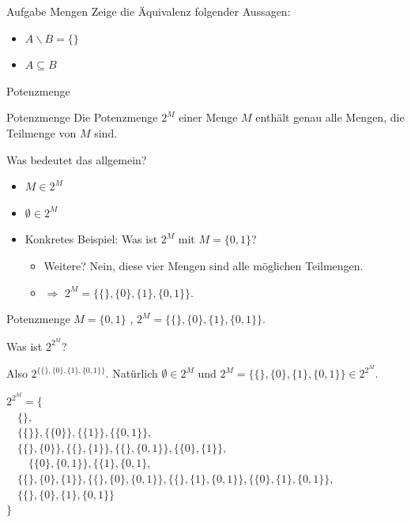 \documentclass{beamer}
\begin{document}
\begin{frame}{Aufgabe Mengen}
	Zeige die Äquivalenz folgender Aussagen:
	\begin{itemize}
		\item $A \backslash B = \{\}$
		\item $A \subseteq B$
	\end{itemize}
\end{frame}

\begin{frame}{Potenzmenge}
	 
	
	\begin{block}{Potenzmenge}
		Die Potenzmenge   $2^M$   einer Menge $M$   enthält genau alle Mengen, die Teilmenge von $M$ sind.	
	\end{block}
	
	 
	
	Was bedeutet das allgemein?
	
	\begin{itemize}
		\item $M \in 2^M$
		\item $\emptyset \in 2^M$
		\item Konkretes Beispiel:   Was ist $2^M$ mit $M = \{0, 1\}$?
		\begin{itemize}
			\pitem Natürlich $\emptyset \in 2^M$ und $\{0, 1\} \in 2^M$.
			\pitem $\{0\} \in 2^M$   und $\{1\} \in 2^M$.
			\item Weitere? \pause  Nein, diese vier Mengen sind alle möglichen Teilmengen.
			\item $\Rightarrow$ $2^M = \{\{\}, \{0\}, \{1\}, \{0, 1\}\}$.
		\end{itemize}
	\end{itemize}
\end{frame}

\begin{frame}{Potenzmenge}
	$M = \{0, 1\}$  , $2^M = \{\{\}, \{0\}, \{1\}, \{0, 1\}\}$. 
	
	Was ist $2^{2^M}$?
	
	\begin{itemize}
		\pitem Also $2^{\{\{\}, \{0\}, \{1\}, \{0, 1\}\}}$.
		\pitem Natürlich $\emptyset \in 2^M$ und $2^M = \{\{\}, \{0\}, \{1\}, \{0, 1\}\} \in 2^{2^M}$.
	\end{itemize}
	
	\pause
	
	$2^{2^M}  
	= 
	\{  $\\$ \quad
	\{\},$\\$ \quad
	\{\{\}\}, 
	\{\{0\}\}, 
	\{\{1\}\},
	\{\{0, 1\}\}, $\\$ \quad
	\{\{\}, \{0\}\}, 
	\{\{\}, \{1\}\}, 
	\{\{\}, \{0, 1\}\}, 
	\{\{0\}, \{1\}\}, $\\$\qquad
	\{\{0\}, \{0, 1\}\}, 
	\{\{1\}, \{0, 1\}, $\\$ \quad
	\{\{\}, \{0\}, \{1\}\}, 
	\{\{\}, \{0\}, \{0, 1\}\}, 
	\{\{\}, \{1\}, \{0, 1\}\}, 
	\{\{0\}, \{1\}, \{0, 1\}\}, $\\$ \quad
	\{\{\}, \{0\}, \{1\}, \{0, 1\}\} $\\$
	\}
	$
\end{frame}
\end{document}
